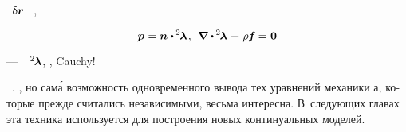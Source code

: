 \begin{otherlanguage}{russian}
\noindent
{}~$\updelta\hspace{-0.1ex}\bm{r}$
\ru{,}
~,

\nopagebreak\vspace{-0.2em}\begin{equation*}
\bm{p} \hspace{.1ex} = \currentunitnormal \hspace{.1ex} \dotp \hspace{-0.1ex} {^2\hspace{-0.2ex}\bm{\lambda}} \hspace{.2ex},
\:\:
\boldnabla \hspace{.1ex} \dotp \hspace{-0.1ex} {^2\hspace{-0.2ex}\bm{\lambda}} \hspace{.2ex} + \hspace{.2ex} \rho \hspace{-0.1ex} \massloadvector \hspace{-0.1ex} = \hspace{.1ex} \zerovector
\end{equation*}

\vspace{-0.25em}\noindent
---
~%
${\hspace{-0.16ex} ^2\hspace{-0.2ex}\bm{\lambda}}$,
,
 Cauchy\:!

~\cite{rabotnov-mechanicsofdeformable}.
,
но сам\'{а} возможность
одно\-времен\-ного вывода
тех уравнений механики \rucontinuum{}а,
которые прежде считались независимыми,
весьма интересна.
В~следующих главах
эта техника
используется
для построения
новых
континуальных моделей.

\end{otherlanguage}
